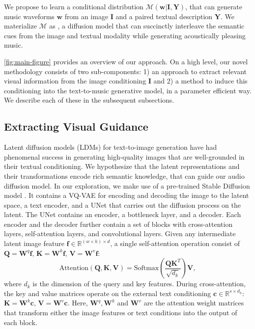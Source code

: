We propose to learn a conditional distribution $\mathcal{M}(\bm{w}|\bm{I}, \bm{Y})$, that can generate music waveforms $\bm{w}$ from an image $\bm{I}$ and a paired textual description $\bm{Y}$. 
We materialize $\mathcal{M}$ as \modelname, a diffusion model that can succinctly interleave the semantic cues from the image and textual modality while generating acoustically pleasing music. 

\cref{fig:main-figure} provides an overview of our approach.
On a high level, our novel methodology consists of two sub-components: 1) an approach to extract relevant visual information from the image conditioning $\bm{I}$ and 2) a method to induce this conditioning into the text-to-music generative model, in a parameter efficient way. We describe each of these in the subsequent subsections.

\subsection{Extracting Visual Guidance} \label{sec:extracting_guidance}
Latent diffusion models (LDMs) for text-to-image generation \cite{rombach2022high} have had phenomenal success in generating high-quality images that are well-grounded in their textual conditioning. We hypothesize that the latent representations and their transformations encode rich semantic knowledge, that can guide our audio diffusion model. In our exploration, we make use of a pre-trained Stable Diffusion model \cite{rombach2022high}. It contains a VQ-VAE \cite{van2017neural} for encoding and decoding the image to the latent space, a text encoder, and a UNet \cite{unet} that carries out the diffusion process on the latent. The UNet contains an encoder, a bottleneck layer, and a decoder. Each encoder and the decoder further contain a set of blocks with cross-attention layers, self-attention layers, and convolutional layers. Given any intermediate latent image feature $\bm{f} \in \mathbb{R}^{(w \times h) \times d}$, a single self-attention \cite{attention} operation consist of $\bm{Q} = \bm{W}^q \bm{f}$, $\bm{K} = \bm{W}^k \bm{f}$, $\bm{V} = \bm{W}^v \bm{f}$:
\begin{equation}
    \text{Attention}(\bm{Q}, \bm{K}, \bm{V}) = \text{Softmax}\left(\frac{\bm{Q} \bm{K}^T}{\sqrt{d_k}}\right)\bm{V},
    \label{eqn:attn}
\end{equation}
where $d_k$ is the dimension of the query and key features. During cross-attention, the key and value matrices operate on the external text conditioning $\bm{c} \in \mathbb{R}^{s \times d_k}$: $\bm{K} = \bm{W}^k \bm{c}$, $\bm{V} = \bm{W}^v \bm{c}$. Here, $\bm{W}^q, \bm{W}^k $ and $ \bm{W}^v$ are the attention weight matrices that transform either the image features or text conditions into the output of each block.

